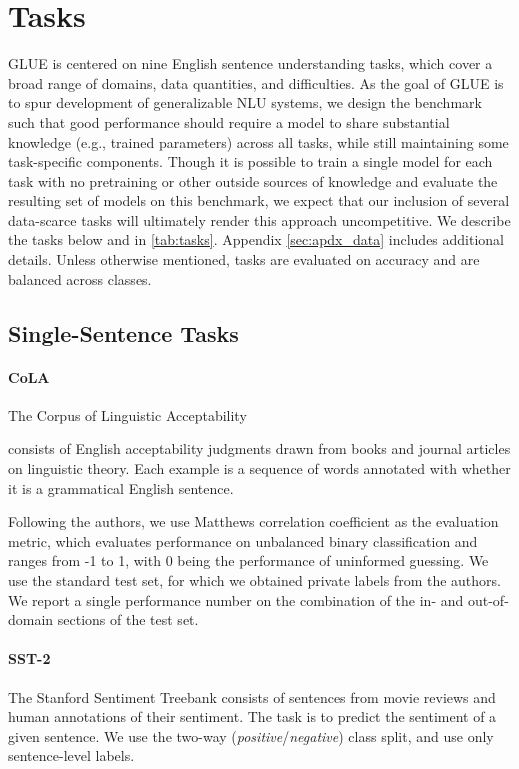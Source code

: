 \section{Tasks}\label{sec:tasks}

GLUE is centered on nine English sentence understanding tasks, which  cover a broad range of domains, data quantities, and difficulties. As the goal of GLUE is to spur development of generalizable NLU systems, we design the benchmark such that good performance should require a model to share substantial knowledge (e.g., trained parameters) across all tasks, while still maintaining some task-specific components. Though it is possible to train a single model for each task with no pretraining or other outside sources of knowledge and evaluate the resulting set of models on this benchmark, we expect that our inclusion of several data-scarce tasks will ultimately render this approach uncompetitive. We describe the tasks below and in \autoref{tab:tasks}.  Appendix \ref{sec:apdx_data} includes additional details. Unless otherwise mentioned, tasks are evaluated on accuracy and are balanced across classes.

\subsection{Single-Sentence Tasks}

\paragraph{CoLA}
The Corpus of Linguistic Acceptability \citep{warstadt2018neural}

consists of English acceptability judgments drawn from books and journal articles on linguistic theory. Each example is a sequence of words annotated with whether it is a grammatical English sentence. 

Following the authors, we use Matthews correlation coefficient \citep{matthews1975comparison} as the evaluation metric, which evaluates performance on unbalanced binary classification and ranges from -1 to 1, with 0 being the performance of uninformed guessing. We use the standard test set, for which we obtained private labels from the authors. We report a single performance number on the combination of the in- and out-of-domain sections of the test set.

\paragraph{SST-2}
The Stanford Sentiment Treebank \citep{socher2013recursive} consists of sentences from movie reviews and human annotations of their sentiment. The task is to predict the sentiment of a given sentence. We use the two-way (\textit{positive}/\textit{negative}) class split, and use only sentence-level labels.

